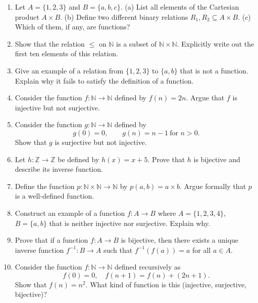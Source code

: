 \begin{enumerate}

  \item Let $A = \{1,2,3\}$ and $B = \{a,b,c\}$.  
  (a) List all elements of the Cartesian product $A \times B$.  
  (b) Define two different binary relations $R_1, R_2 \subseteq A \times B$.  
  (c) Which of them, if any, are functions?

  \item Show that the relation $\leq$ on $\mathbb{N}$ is a subset of $\mathbb{N} \times \mathbb{N}$.  
  Explicitly write out the first ten elements of this relation.

  \item Give an example of a relation from $\{1,2,3\}$ to $\{a,b\}$ that is not a function.  
  Explain why it fails to satisfy the definition of a function.

  \item Consider the function $f : \mathbb{N} \to \mathbb{N}$ defined by $f(n) = 2n$.  
  Argue that $f$ is injective but not surjective.  

  \item Consider the function $g : \mathbb{N} \to \mathbb{N}$ defined by  
  \[
    g(0) = 0, \qquad g(n) = n-1 \ \text{for } n > 0.
  \]
  Show that $g$ is surjective but not injective.  

  \item Let $h : \mathbb{Z} \to \mathbb{Z}$ be defined by $h(x) = x+5$.  
  Prove that $h$ is bijective and describe its inverse function.

  \item Define the function $p : \mathbb{N} \times \mathbb{N} \to \mathbb{N}$ by $p(a,b) = a \times b$.  
  Argue formally that $p$ is a well-defined function.

  \item Construct an example of a function $f : A \to B$ where $A = \{1,2,3,4\}$, $B = \{a,b\}$ 
  that is neither injective nor surjective. Explain why.

  \item Prove that if a function $f : A \to B$ is bijective, then there exists a unique inverse 
  function $f^{-1} : B \to A$ such that $f^{-1}(f(a)) = a$ for all $a \in A$.  

  \item Consider the function $f : \mathbb{N} \to \mathbb{N}$ defined recursively as  
  \[
    f(0) = 0, \quad f(n+1) = f(n) + (2n+1).
  \]
  Show that $f(n) = n^2$. What kind of function is this (injective, surjective, bijective)?  


\end{enumerate}
